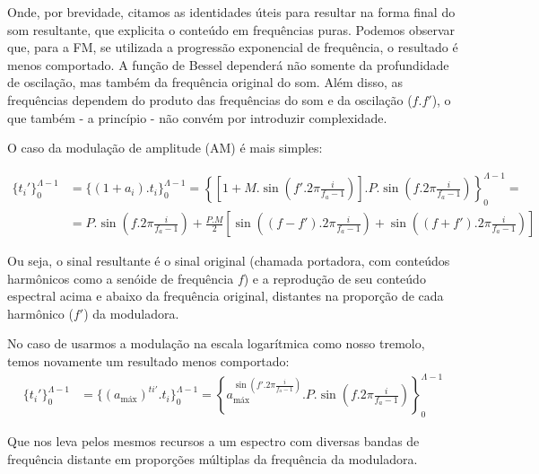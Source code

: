 Onde, por brevidade, citamos as identidades úteis para resultar na
forma final do som resultante, que explicita o conteúdo em frequências puras.
Podemos observar que, para a FM, se utilizada a progressão exponencial de frequência, o resultado
é menos comportado. A função de Bessel dependerá não somente da profundidade de oscilação,
mas também da frequência original do som. Além disso, as frequências dependem do produto das frequências
do som e da oscilação ($f.f'$), o que também - a princípio - não convém por introduzir complexidade.

O caso da modulação de amplitude (AM) é mais simples:

\begin{equation}\label{eq:am}
\begin{split}
\{t_i'\}_0^{\Lambda-1} & =\{(1+a_i) . t_i\}_0^{\Lambda-1}= \left \{ \left [ 1+M.\sin \left ( f'.2\pi\frac{i}{f_a -1} \right ) \right] . P .\sin \left ( f.2\pi\frac{i}{f_a -1} \right ) \right \}_0^{\Lambda-1} = \\
& = P.\sin \left( f.2\pi\frac{i}{f_a -1}  \right ) + \frac{P.M}{2} \left [ \sin \left( (f-f').2\pi\frac{i}{f_a -1}  \right ) + \sin \left( (f+f').2\pi\frac{i}{f_a -1}  \right ) \right ]
\end{split}
\end{equation}

Ou seja, o sinal resultante é o sinal original (chamada portadora, com conteúdos harmônicos como a senóide de frequência $f$)
e a reprodução de seu conteúdo espectral acima e abaixo da frequência
original, distantes na proporção de cada harmônico ($f'$) da moduladora.

No caso de usarmos a modulação na escala logarítmica como nosso tremolo, temos novamente
um resultado menos comportado:
\begin{equation}\label{eq:am}
\begin{split}
\{t_i'\}_0^{\Lambda-1} & =\{(a_{\text{máx}})^{ti'} . t_i\}_0^{\Lambda-1}= \left \{ a_{\text{máx}}^{\sin \left ( f'.2\pi\frac{i}{f_a -1} \right )} . P .\sin \left ( f.2\pi\frac{i}{f_a -1} \right ) \right \}_0^{\Lambda-1} 
\end{split}
\end{equation}

Que nos leva pelos mesmos recursos a um espectro com diversas bandas de frequência distante
em proporções múltiplas da frequência da moduladora.

